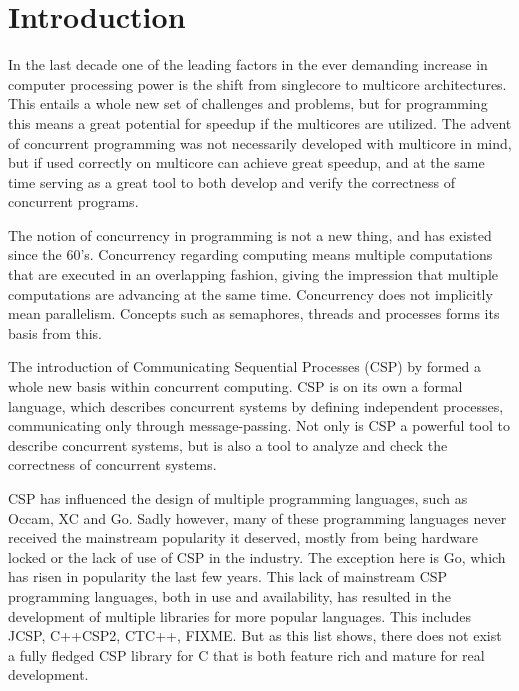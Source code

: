 
\chapter{Introduction}

In the last decade one of the leading factors in the ever demanding increase in computer processing power is the shift from singlecore to multicore architectures. This entails a whole new set of challenges and problems, but for programming this means a great potential for speedup if the multicores are utilized. The advent of concurrent programming was not necessarily developed with multicore in mind, but if used correctly on multicore can achieve great speedup, and at the same time serving as a great tool to both develop and verify the correctness of concurrent programs. 

The notion of concurrency in programming is not a new thing, and has existed since the 60's. Concurrency regarding computing means multiple computations that are executed in an overlapping fashion, giving the impression that multiple computations are advancing at the same time. Concurrency does not implicitly mean parallelism. Concepts such as semaphores, threads and processes forms its basis from this. 

The introduction of Communicating Sequential Processes (CSP) by \citet{hoarashenhurst1978} formed a whole new basis within concurrent computing. CSP is on its own a formal language, which describes concurrent systems by defining independent processes, communicating only through message-passing. Not only is CSP a powerful tool to describe concurrent systems, but is also a tool to analyze and check the correctness of concurrent systems. 

CSP has influenced the design of multiple programming languages, such as Occam, XC and Go. Sadly however, many of these programming languages never received the mainstream popularity it deserved, mostly from being hardware locked  or the lack of use of CSP in the industry. The exception here is Go, which has risen in popularity the last few years. This lack of mainstream CSP programming languages, both in use and availability, has resulted in the development of multiple libraries for more popular languages. This includes JCSP, C++CSP2, CTC++, FIXME. But as this list shows, there does not exist a fully fledged CSP library for C that is both feature rich and mature for real development. 


